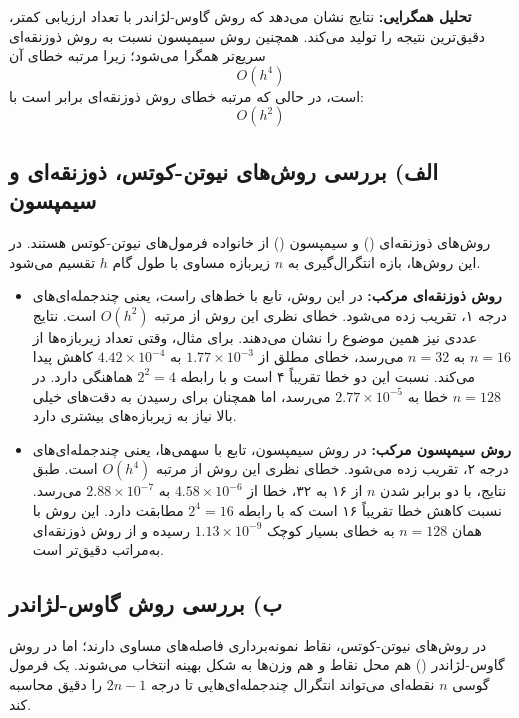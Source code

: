 \documentclass[12pt,a4paper]{article}
\begin{document}
	\textbf{تحلیل همگرایی:}
	نتایج نشان می‌دهد که روش گاوس-لژاندر با تعداد ارزیابی کمتر، دقیق‌ترین نتیجه را تولید می‌کند. همچنین روش سیمپسون نسبت به روش ذوزنقه‌ای سریع‌تر همگرا می‌شود؛ زیرا مرتبه خطای آن
	\[
	O(h^4)
	\]
	است، در حالی که مرتبه خطای روش ذوزنقه‌ای برابر است با:
	\[
	O(h^2)
	\]
	
	\subsection*{الف) بررسی روش‌های نیوتن-کوتس، ذوزنقه‌ای و سیمپسون}
	
	روش‌های ذوزنقه‌ای
	()
	و سیمپسون
	()
	از خانواده فرمول‌های نیوتن-کوتس هستند. در این روش‌ها، بازه انتگرال‌گیری به
	$n$
	زیربازه مساوی با طول گام
	$h$
	تقسیم می‌شود.
	
	\begin{itemize}
		\item \textbf{روش ذوزنقه‌ای مرکب:}
		در این روش، تابع با خط‌های راست، یعنی چندجمله‌ای‌های درجه ۱، تقریب زده می‌شود. خطای نظری این روش از مرتبه
		$O(h^2)$
		است. نتایج عددی نیز همین موضوع را نشان می‌دهند. برای مثال، وقتی تعداد زیربازه‌ها از
		$n=16$
		به
		$n=32$
		می‌رسد، خطای مطلق از
		$1.77 \times 10^{-3}$
		به
		$4.42 \times 10^{-4}$
		کاهش پیدا می‌کند. نسبت این دو خطا تقریباً ۴ است و با رابطه
		$2^2=4$
		هماهنگی دارد. در
		$n=128$
		خطا به
		$2.77 \times 10^{-5}$
		می‌رسد، اما همچنان برای رسیدن به دقت‌های خیلی بالا نیاز به زیربازه‌های بیشتری دارد.
		
		\item \textbf{روش سیمپسون مرکب:}
		در روش سیمپسون، تابع با سهمی‌ها، یعنی چندجمله‌ای‌های درجه ۲، تقریب زده می‌شود. خطای نظری این روش از مرتبه
		$O(h^4)$
		است. طبق نتایج، با دو برابر شدن
		$n$
		از ۱۶ به ۳۲، خطا از
		$4.58 \times 10^{-6}$
		به
		$2.88 \times 10^{-7}$
		می‌رسد. نسبت کاهش خطا تقریباً ۱۶ است که با رابطه
		$2^4=16$
		مطابقت دارد. این روش با همان
		$n=128$
		به خطای بسیار کوچک
		$1.13 \times 10^{-9}$
		رسیده و از روش ذوزنقه‌ای به‌مراتب دقیق‌تر است.
	\end{itemize}
	
	\subsection*{ب) بررسی روش گاوس-لژاندر}
	
	در روش‌های نیوتن-کوتس، نقاط نمونه‌برداری فاصله‌های مساوی دارند؛ اما در روش گاوس-لژاندر
	()
	هم محل نقاط و هم وزن‌ها به شکل بهینه انتخاب می‌شوند. یک فرمول گوسی
	$n$
	نقطه‌ای می‌تواند انتگرال چندجمله‌ای‌هایی تا درجه
	$2n-1$
	را دقیق محاسبه کند.
	
\end{document}
